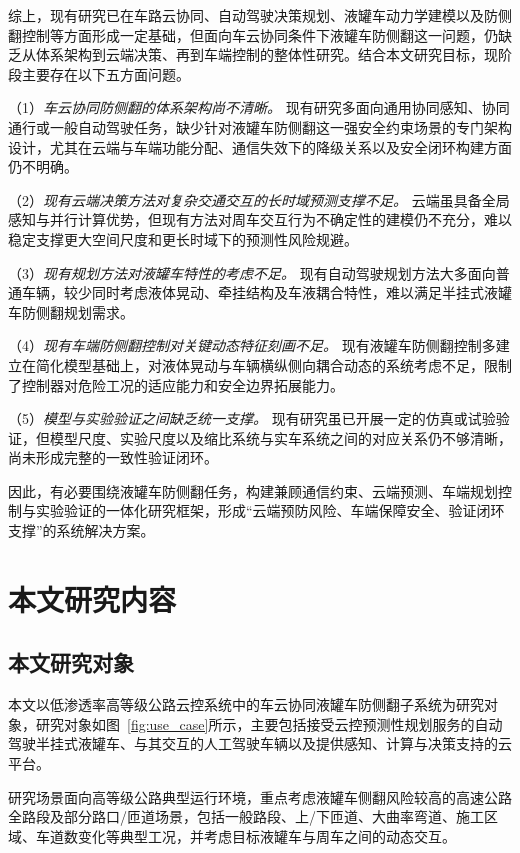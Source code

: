     综上，现有研究已在车路云协同、自动驾驶决策规划、液罐车动力学建模以及防侧翻控制等方面形成一定基础，但面向车云协同条件下液罐车防侧翻这一问题，仍缺乏从体系架构到云端决策、再到车端控制的整体性研究。结合本文研究目标，现阶段主要存在以下五方面问题。

    （1）\emph{车云协同防侧翻的体系架构尚不清晰。}
    现有研究多面向通用协同感知、协同通行或一般自动驾驶任务，缺少针对液罐车防侧翻这一强安全约束场景的专门架构设计，尤其在云端与车端功能分配、通信失效下的降级关系以及安全闭环构建方面仍不明确。

    （2）\emph{现有云端决策方法对复杂交通交互的长时域预测支撑不足。}
    云端虽具备全局感知与并行计算优势，但现有方法对周车交互行为不确定性的建模仍不充分，难以稳定支撑更大空间尺度和更长时域下的预测性风险规避。

    （3）\emph{现有规划方法对液罐车特性的考虑不足。}
    现有自动驾驶规划方法大多面向普通车辆，较少同时考虑液体晃动、牵挂结构及车液耦合特性，难以满足半挂式液罐车防侧翻规划需求。

    （4）\emph{现有车端防侧翻控制对关键动态特征刻画不足。}
    现有液罐车防侧翻控制多建立在简化模型基础上，对液体晃动与车辆横纵侧向耦合动态的系统考虑不足，限制了控制器对危险工况的适应能力和安全边界拓展能力。

    （5）\emph{模型与实验验证之间缺乏统一支撑。}
    现有研究虽已开展一定的仿真或试验验证，但模型尺度、实验尺度以及缩比系统与实车系统之间的对应关系仍不够清晰，尚未形成完整的一致性验证闭环。

    因此，有必要围绕液罐车防侧翻任务，构建兼顾通信约束、云端预测、车端规划控制与实验验证的一体化研究框架，形成“云端预防风险、车端保障安全、验证闭环支撑”的系统解决方案。



\section{本文研究内容}
\label{sec:thesis_content}

  \subsection{本文研究对象}

    本文以低渗透率高等级公路云控系统中的车云协同液罐车防侧翻子系统为研究对象，研究对象如图~\ref{fig:use_case}所示，主要包括接受云控预测性规划服务的自动驾驶半挂式液罐车、与其交互的人工驾驶车辆以及提供感知、计算与决策支持的云平台。

    研究场景面向高等级公路典型运行环境，重点考虑液罐车侧翻风险较高的高速公路全路段及部分路口/匝道场景，包括一般路段、上/下匝道、大曲率弯道、施工区域、车道数变化等典型工况，并考虑目标液罐车与周车之间的动态交互。

